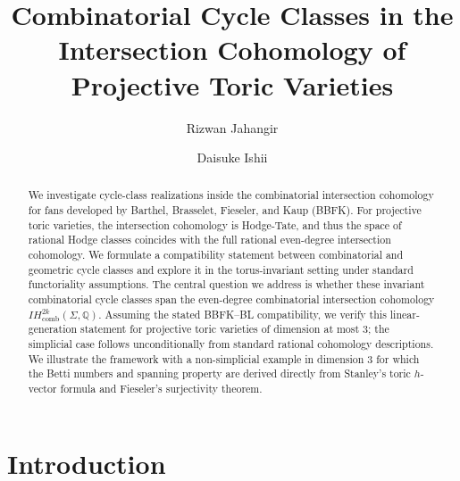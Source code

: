 \documentclass[12pt,reqno]{amsart}
\theoremstyle{plain}
\theoremstyle{definition}
\begin{document}
	
	\title[Combinatorial Cycle Classes]{Combinatorial Cycle Classes in the Intersection Cohomology of Projective Toric Varieties}
	\author{Rizwan Jahangir}
	\address{Kiara Inc.\ Tokyo, Japan, and NUST Business School, NUST H-12 Campus, Off Srinagar Highway, Islamabad 44000, Pakistan}
	
	\author{Daisuke Ishii}
	\address{Kiara Inc.\ Tokyo, Japan}
	
	
	\begin{abstract}
		We investigate cycle-class realizations inside the combinatorial intersection cohomology for fans developed by Barthel, Brasselet, Fieseler, and Kaup (BBFK). For projective toric varieties, the intersection cohomology is Hodge-Tate, and thus the space of rational Hodge classes coincides with the full rational even-degree intersection cohomology. We formulate a compatibility statement between combinatorial and geometric cycle classes and explore it in the torus-invariant setting under standard functoriality assumptions. The central question we address is whether these invariant combinatorial cycle classes span the even-degree combinatorial intersection cohomology $IH^{2k}_{\mathrm{comb}}(\Sigma, \mathbb{Q})$. Assuming the stated BBFK--BL compatibility, we verify this linear-generation statement for projective toric varieties of dimension at most $3$; the simplicial case follows unconditionally from standard rational cohomology descriptions. We illustrate the framework with a non-simplicial example in dimension $3$ for which the Betti numbers and spanning property are derived directly from Stanley's toric $h$-vector formula and Fieseler's surjectivity theorem.
	\end{abstract}
	
	\maketitle
	
	\section{Introduction}
	
\end{document}

